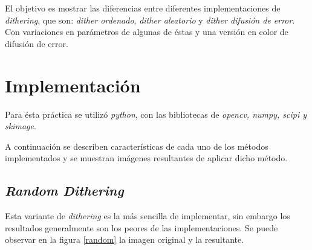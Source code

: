 \documentclass[conference]{IEEEtran}
\begin{document}
El objetivo es mostrar las diferencias entre diferentes implementaciones de \textit{dithering}, que son: \textit{dither ordenado}, \textit{dither aleatorio} y \textit{dither difusión de error}. Con variaciones en parámetros de algunas de éstas y una versión en color de difusión de error.


%
%


\section{Implementación}

Para ésta práctica se utilizó \textit{python}, con las bibliotecas de \textit{opencv, numpy, scipi  y skimage}.

A continuación se describen características de cada uno de los métodos implementados y se muestran imágenes resultantes de aplicar dicho método.


\subsection{\textit{Random Dithering}}

Esta variante de \textit{dithering} es la más sencilla de implementar, sin embargo los resultados generalmente son los peores de las implementaciones. Se puede observar en la figura \ref{random} la  imagen original y la resultante.
\end{document}
